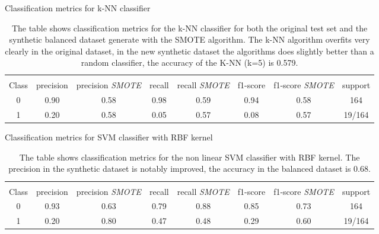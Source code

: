 \documentclass[11pt]{article}
\theoremstyle{definition}
\theoremstyle{remark}
\begin{document}
\begin{table}[H]
\caption{Classification metrics for k-NN classifier} \label{tab:k-NN_smote} 
\begin{center} 
\begin{tabular}{cccccccc}
\hline
\multicolumn{1}{c}{} \\
Class & precision & precision \textit{SMOTE}& recall & recall \textit{SMOTE}& f1-score & f1-score \textit{SMOTE} & support     \\
\hline
0 & 0.90  &  0.58 &  0.98  & 0.59 &  0.94   &  0.58 &  164 \\
1 & 0.20  &  0.58 &  0.05  & 0.57 &  0.08   &  0.57  &  19/164 \\
\hline
\end{tabular}
\caption{The table shows classification metrics for the k-NN classifier for both the original test set and the synthetic balanced dataset generate with the SMOTE algorithm. The k-NN algorithm overfits very clearly in the original dataset, in the new synthetic dataset the algorithms does slightly better than a random classifier, the accuracy of the K-NN (k=5) is 0.579.}
\end{center}
\end{table}

\begin{table}[H]
\caption{Classification metrics for SVM classifier with RBF kernel} \label{tab:svm_smote} 
\begin{center} 
\begin{tabular}{cccccccc}
\hline
\multicolumn{1}{c}{} \\
Class & precision & precision \textit{SMOTE}& recall & recall \textit{SMOTE}& f1-score & f1-score \textit{SMOTE} & support     \\
\hline
0 & 0.93  & 0.63  &  0.79  & 0.88 &  0.85    &  0.73 &  164 \\
1 & 0.20  & 0.80  &  0.47  & 0.48 &  0.29    &  0.60  &  19/164 \\
\hline
\end{tabular}
\caption{The table shows classification metrics for the non linear SVM classifier with RBF kernel. The precision in the synthetic dataset is notably improved, the accuracy in the balanced dataset is 0.68.}
\end{center}
\end{table}
\end{document}
